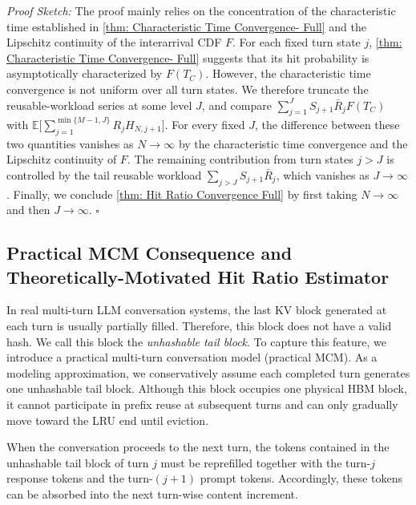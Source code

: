 \documentclass{article}
\theoremstyle{definition}
\newcommand{\E}{\mathbb E}
\begin{document}
\noindent\textit{Proof Sketch:} The proof mainly relies on the concentration of the characteristic time established in \cref{thm: Characteristic Time Convergence- Full} and the Lipschitz continuity of the interarrival CDF $F$. For each fixed turn state $j$, \cref{thm: Characteristic Time Convergence- Full} suggests that its hit probability is asymptotically characterized by $F(T_C)$. However, the characteristic time convergence is not uniform over all turn states. We therefore truncate the reusable-workload series at some level $J$, and compare $\sum_{j=1}^{J}S_{j+1}\bar R_jF(T_C)$ with $\E\big[\sum\limits_{j=1}^{\min\{M-1,J\}}R_jH_{N,j+1}\big].$ For every fixed $J$, the difference between these two quantities vanishes as $N\rightarrow\infty$ by the characteristic time convergence and the Lipschitz continuity of $F$. The remaining contribution from turn states $j>J$ is controlled by the tail reusable workload $\sum_{j>J}S_{j+1}\bar R_j$, which vanishes as $J\rightarrow\infty$. Finally, we conclude \cref{thm: Hit Ratio Convergence Full} by first taking $N\rightarrow\infty$ and then $J\rightarrow\infty$. \hfill $\square$


\subsection{Practical MCM Consequence and Theoretically-Motivated Hit Ratio Estimator}
\label{ssec: Practical MCM Consequence and Theoretically-Motivated Hit Ratio Estimator}


In real multi-turn LLM conversation systems, the last KV block generated at each turn is usually partially filled. Therefore, this block does not have a valid hash. We call this block the \emph{unhashable tail block}. To capture this feature, we introduce a practical multi-turn conversation model (practical MCM). As a modeling approximation, we conservatively assume each completed turn generates one unhashable tail block. Although this block occupies one physical HBM block, it cannot participate in prefix reuse at subsequent turns and can only gradually move toward the LRU end until eviction.

When the conversation proceeds to the next turn, the tokens contained in the unhashable tail block of turn $j$ must be reprefilled together with the turn-$j$ response tokens and the turn-$(j+1)$ prompt tokens. Accordingly, these tokens can be absorbed into the next turn-wise content increment. %
\end{document}
